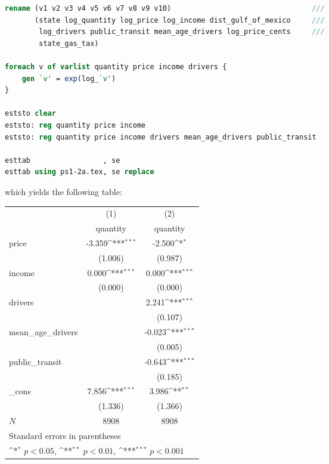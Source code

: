 \documentclass[answers, reflections, 11pt]{padajar-pset}
\begin{document}
\begin{questions}
\begin{parts}
\begin{solution}
\begin{lstlisting}[language=Stata]
rename (v1 v2 v3 v4 v5 v6 v7 v8 v9 v10)									///
	   (state log_quantity log_price log_income dist_gulf_of_mexico		///
		log_drivers public_transit mean_age_drivers log_price_cents		///
		state_gas_tax)

foreach v of varlist quantity price income drivers {
	gen `v' = exp(log_`v')
}

eststo clear
eststo: reg quantity price income
eststo: reg quantity price income drivers mean_age_drivers public_transit

esttab                 , se
esttab using ps1-2a.tex, se replace\end{lstlisting}

		which yields the following table:
		\begin{center}
			\small{
				\def\sym#1{\ifmmode^{#1}\else\(^{#1}\)\fi}
				\begin{tabular}{l*{2}{c}}
					\hline\hline
					&\multicolumn{1}{c}{(1)}&\multicolumn{1}{c}{(2)}\\
					&\multicolumn{1}{c}{quantity}&\multicolumn{1}{c}{quantity}\\
					\hline
					price       &      -3.359\sym{***}&      -2.500\sym{*}  \\
					&     (1.006)         &     (0.987)         \\
					[1em]
					income      &       0.000\sym{***}&       0.000\sym{***}\\
					&     (0.000)         &     (0.000)         \\
					[1em]
					drivers     &                     &       2.241\sym{***}\\
					&                     &     (0.107)         \\
					[1em]
					mean\_age\_drivers&                     &      -0.023\sym{***}\\
					&                     &     (0.005)         \\
					[1em]
					public\_transit&                     &      -0.643\sym{***}\\
					&                     &     (0.185)         \\
					[1em]
					\_cons      &       7.856\sym{***}&       3.986\sym{**} \\
					&     (1.336)         &     (1.366)         \\
					\hline
					\(N\)       &        8908         &        8908         \\
					\hline\hline
					\multicolumn{3}{l}{\footnotesize Standard errors in parentheses}\\
					\multicolumn{3}{l}{\footnotesize \sym{*} \(p<0.05\), \sym{**} \(p<0.01\), \sym{***} \(p<0.001\)}\\
				\end{tabular}
			}
		\end{center}
	\end{solution}

\end{parts}
\end{questions}
\end{document}
